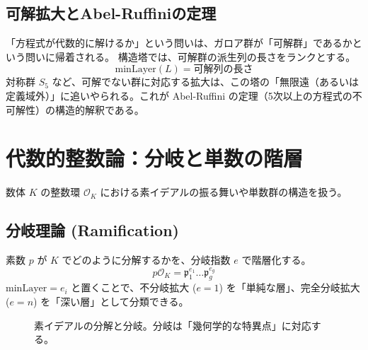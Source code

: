 \documentclass[a4paper,11pt]{ltjsarticle}
\theoremstyle{definition}
\newcommand{\Oint}{\mathcal{O}}
\newcommand{\MinLayer}{\mathrm{minLayer}}
\begin{document}
\subsection{可解拡大とAbel-Ruffiniの定理}
「方程式が代数的に解けるか」という問いは、ガロア群が「可解群」であるかという問いに帰着される。
構造塔では、可解群の派生列の長さをランクとする。
\[ \MinLayer(L) = \text{可解列の長さ} \]
対称群 $S_5$ など、可解でない群に対応する拡大は、この塔の「無限遠（あるいは定義域外）」に追いやられる。これが Abel-Ruffini の定理（5次以上の方程式の不可解性）の構造的解釈である。

\section{代数的整数論：分岐と単数の階層}

数体 $K$ の整数環 $\Oint_K$ における素イデアルの振る舞いや単数群の構造を扱う。

\subsection{分岐理論 (Ramification)}
素数 $p$ が $K$ でどのように分解するかを、分岐指数 $e$ で階層化する。
\[ p\Oint_K = \mathfrak{p}_1^{e_1} \dots \mathfrak{p}_g^{e_g} \]
$\MinLayer = e_i$ と置くことで、不分岐拡大 ($e=1$) を「単純な層」、完全分岐拡大 ($e=n$) を「深い層」として分類できる。

\begin{figure}[h]
\centering
{}
\caption{素イデアルの分解と分岐。分岐は「幾何学的な特異点」に対応する。}
\end{figure}
\end{document}
